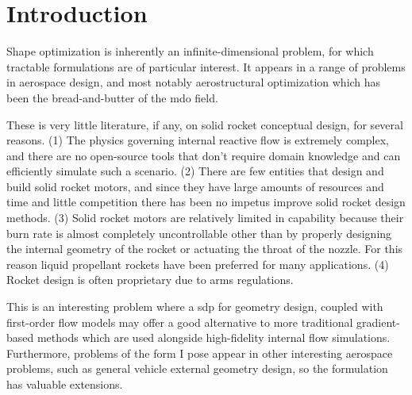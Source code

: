     \section{Introduction}

    Shape optimization is inherently an infinite-dimensional problem,
    for which tractable formulations are of particular interest.
    It appears in a range of problems in aerospace design, and most notably
    aerostructural optimization which has been the bread-and-butter of the \gls{mdo} field.

    These is very little literature, if any, on solid rocket conceptual design,
    for several reasons. (1) The physics governing internal reactive flow is extremely complex,
    and there are no open-source tools that don't require domain knowledge and
    can efficiently simulate such a scenario.
    (2) There are few entities that design and build solid rocket motors, and since they have
    large amounts of resources and time and little competition there has been no impetus
    improve solid rocket design methods. (3) Solid rocket motors are relatively limited
    in capability because their burn rate is almost completely uncontrollable other
    than by properly designing the internal geometry of the rocket or actuating the
    throat of the nozzle. For this reason liquid propellant rockets have been preferred for
    many applications. (4) Rocket design is often proprietary due to arms regulations.

    This is an interesting problem where a \gls{sdp} for geometry design,
    coupled with first-order flow models may offer a good alternative to
    more traditional gradient-based methods which are used alongside
    high-fidelity internal flow simulations.
    Furthermore, problems of the form I pose appear in other interesting
    aerospace problems, such as general vehicle external geometry design,
    so the formulation has valuable extensions.
